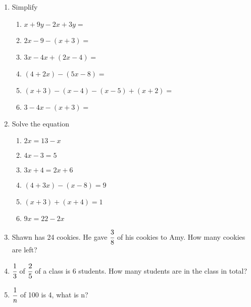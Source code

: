 \documentclass[12pt,letterpaper]{article}
\begin{document}
\begin{enumerate}
        \item Simplify
            \begin{enumerate}
                \item $x+9y-2x+3y=$
                \item $2x-9-(x+3)=$
                \item $3x-4x+(2x-4)=$
                \item $(4+2x)-(5x-8)=$
                \item $(x+3)-(x-4)-(x-5)+(x+2)=$
                \item $3-4x-(x+3)=$
            \end{enumerate}
        \item Solve the equation
        \begin{enumerate}
            \item $2x=13-x$
            \item $4x-3=5$
            \item $3x+4=2x+6$
            \item $(4+3x)-(x-8)=9$
            \item $(x+3)+(x+4)=1$
            \item $9x=22-2x$
        \end{enumerate}
    \item Shawn has 24 cookies. He gave $\cfrac{3}{8}$ of his cookies to Amy. How many cookies are left?
    \vspace{3cm}
    \item $\cfrac{1}{3}$ of $\cfrac{2}{5}$ of a class is 6 students. How many students are in the class in total?
    \vspace{3cm}
    \item $\cfrac{1}{n}$ of 100 is 4, what is n?
\end{enumerate}
\end{document}
